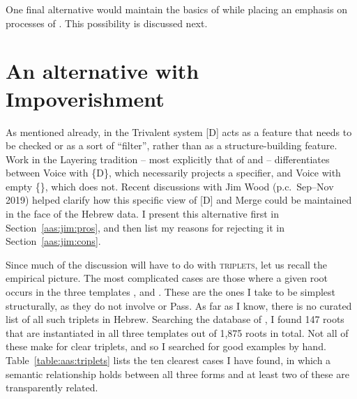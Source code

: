 \begin{exe}
\begin{xlist}
\begin{exe}
\begin{exe}
\begin{xlist}
\begin{exe}
\begin{exe}
\begin{exe}
\begin{exe}
\begin{exe}
\begin{xlist}
\begin{exe}
One final alternative would maintain the basics of  while placing an emphasis on processes of . This possibility is discussed next.

\section{An alternative with Impoverishment} \label{aas:jim}

\label{r1:g:2c2}As mentioned already, in the Trivalent system [D] acts as a feature that needs to be checked or as a sort of ``filter'', rather than as a structure-building feature. Work in the Layering tradition -- most explicitly that of \cite{schaefer08} and \cite{wood15springer} -- differentiates between Voice with \{D\}, which necessarily projects a specifier, and Voice with empty \{\}, which does not. Recent discussions with Jim Wood (p.c.~Sep--Nov 2019) helped clarify how this specific view of [D] and Merge could be maintained in the face of the Hebrew data. I present this alternative first in Section~\ref{aas:jim:pros}, and then list my reasons for rejecting it in Section~\ref{aas:jim:cons}.

Since much of the discussion will have to do with \textsc{triplets}, let us recall the empirical picture. The most complicated cases are those where a given root occurs in the three templates {\tkal}, {\tnif} and {\thif}. These are the ones I take to be simplest structurally, as they do not involve {\va} or Pass. As far as I know, there is no curated list of all such triplets in Hebrew. Searching the database of \cite{ehrenfeld12}, I found 147 roots that are instantiated in all three templates out of 1,875 roots in total. Not all of these make for clear triplets, and so I searched for good examples by hand. Table~\ref{table:aas:triplets} lists the ten clearest cases I have found, in which a semantic relationship holds between all three forms and at least two of these are transparently related.


\end{exe}
\end{xlist}
\end{exe}
\end{exe}
\end{exe}
\end{exe}
\end{exe}
\end{xlist}
\end{exe}
\end{exe}
\end{xlist}
\end{exe}
